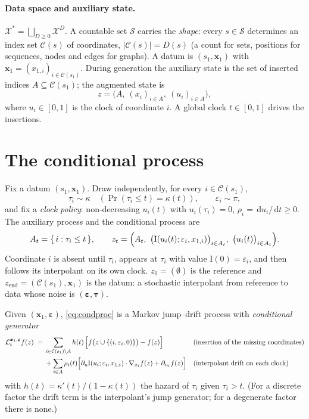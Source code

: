 \documentclass[11pt]{article}
\newcommand{\X}{\mathcal{X}}
\newcommand{\Sa}{\mathcal{S}}
\newcommand{\C}{\mathcal{C}}
\newcommand{\A}{A}
\newcommand{\gen}{\mathcal{L}}
\newcommand{\dd}{\,\mathrm{d}}
\newcommand{\bx}{\bm{x}}
\newcommand{\beps}{\bm{\varepsilon}}
\newcommand{\btau}{\bm{\tau}}
\newcommand{\Iu}{\mathrm{I}}
\begin{document}
\paragraph{Data space and auxiliary state.}
$\X^{*}=\bigsqcup_{D\ge 0}\X^{D}$. A countable set $\Sa$ carries the \emph{shape}: every $s\in\Sa$ determines an index set $\C(s)$ of coordinates, $|\C(s)|=D(s)$ (a count for sets, positions for sequences, nodes and edges for graphs). A datum is $(s_1,\bx_1)$ with $\bx_1=(x_{1,i})_{i\in\C(s_1)}$. During generation the auxiliary state is the set of inserted indices $\A\subseteq\C(s_1)$; the augmented state is
\begin{equation}
z=\bigl(\A,\ (x_i)_{i\in\A},\ (u_i)_{i\in\A}\bigr),
\end{equation}
where $u_i\in[0,1]$ is the clock of coordinate $i$. A global clock $t\in[0,1]$ drives the insertions.

\section{The conditional process}
\label{sec:conditional}

Fix a datum $(s_1,\bx_1)$. Draw independently, for every $i\in\C(s_1)$,
\begin{equation}
\tau_i\sim\kappa\quad(\Pr(\tau_i\le t)=\kappa(t)),\qquad \varepsilon_i\sim\pi ,
\end{equation}
and fix a \emph{clock policy}: non-decreasing $u_i(t)$ with $u_i(\tau_i)=0$, $\rho_i=\dd u_i/\dd t\ge0$. The auxiliary process and the conditional process are
\begin{equation}
\label{eq:condproc}
\A_t=\{\,i:\tau_i\le t\,\},\qquad
z_t=\Bigl(\A_t,\ \bigl(\Iu(u_i(t);\varepsilon_i,x_{1,i})\bigr)_{i\in\A_t},\ \bigl(u_i(t)\bigr)_{i\in\A_t}\Bigr).
\end{equation}
Coordinate $i$ is absent until $\tau_i$, appears at $\tau_i$ with value $\Iu(0)=\varepsilon_i$, and then follows its interpolant on its own clock. $z_0=(\emptyset)$ is the reference and $z_{\mathrm{end}}=(\C(s_1),\bx_1)$ is the datum: a stochastic interpolant from reference to data whose noise is $(\beps,\btau)$.

Given $(\bx_1,\beps)$, \eqref{eq:condproc} is a Markov jump--drift process with \emph{conditional generator}
\begin{equation}
\label{eq:condgen}
\begin{aligned}
\gen^{\bx_1,\beps}_t f(z)\;=\;&\sum_{i\in\C(s_1)\setminus\A} h(t)\,\Bigl[f\bigl(z\cup\{(i,\varepsilon_i,0)\}\bigr)-f(z)\Bigr]
&&\text{(insertion of the missing coordinates)}\\
&+\sum_{i\in\A}\rho_i(t)\Bigl[\partial_u\Iu(u_i;\varepsilon_i,x_{1,i})\cdot\nabla_{x_i}f(z)+\partial_{u_i}f(z)\Bigr]
&&\text{(interpolant drift on each clock)}
\end{aligned}
\end{equation}
with $h(t)=\kappa'(t)/(1-\kappa(t))$ the hazard of $\tau_i$ given $\tau_i>t$. (For a discrete factor the drift term is the interpolant's jump generator; for a degenerate factor there is none.)
\end{document}
